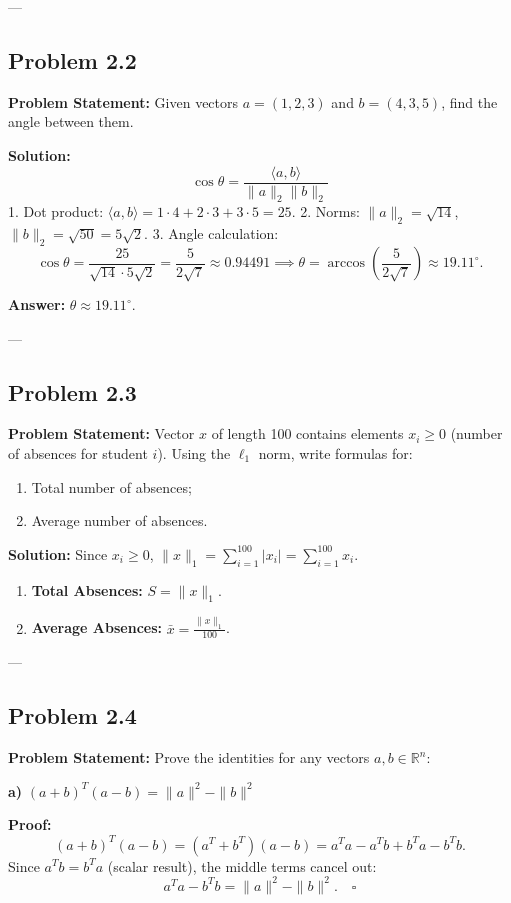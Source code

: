 \documentclass[11pt, a4paper]{article}
\begin{document}
---

\subsection*{Problem 2.2}
\textbf{Problem Statement:} Given vectors $a=(1,2,3)$ and $b=(4,3,5)$, find the angle between them.

\textbf{Solution:}
$$ \cos \theta = \frac{\langle a, b \rangle}{\|a\|_2 \|b\|_2} $$
1. Dot product: $\langle a, b \rangle = 1 \cdot 4 + 2 \cdot 3 + 3 \cdot 5 = 25$.
2. Norms: $\|a\|_2 = \sqrt{14}$, $\|b\|_2 = \sqrt{50} = 5\sqrt{2}$.
3. Angle calculation:
$$ \cos \theta = \frac{25}{\sqrt{14} \cdot 5\sqrt{2}} = \frac{5}{2\sqrt{7}} \approx 0.94491 \implies \theta = \arccos\left(\frac{5}{2\sqrt{7}}\right) \approx 19.11^\circ. $$

\textbf{Answer:} $\theta \approx 19.11^\circ$.

---

\subsection*{Problem 2.3}
\textbf{Problem Statement:} Vector $x$ of length 100 contains elements $x_i \ge 0$ (number of absences for student $i$). Using the $\ell_1$ norm, write formulas for:
\begin{enumerate}[label=\alph*.]
\item Total number of absences;
\item Average number of absences.
\end{enumerate}

\textbf{Solution:}
Since $x_i \ge 0$, $\|x\|_1 = \sum_{i=1}^{100} |x_i| = \sum_{i=1}^{100} x_i$.
\begin{enumerate}[label=\alph*.]
\item \textbf{Total Absences:} $S = \|x\|_1$.
\item \textbf{Average Absences:} $\bar{x} = \frac{\|x\|_1}{100}$.
\end{enumerate}

---

\subsection*{Problem 2.4}
\textbf{Problem Statement:} Prove the identities for any vectors $a, b \in \mathbb{R}^n$:

\medskip
\textbf{a)} $(a+b)^T(a-b) = \|a\|^2 - \|b\|^2$

\textbf{Proof:}
$$ (a+b)^T(a-b) = (a^T + b^T)(a - b) = a^T a - a^T b + b^T a - b^T b. $$
Since $a^T b = b^T a$ (scalar result), the middle terms cancel out:
$$ a^T a - b^T b = \|a\|^2 - \|b\|^2. \quad \square $$
\end{document}
